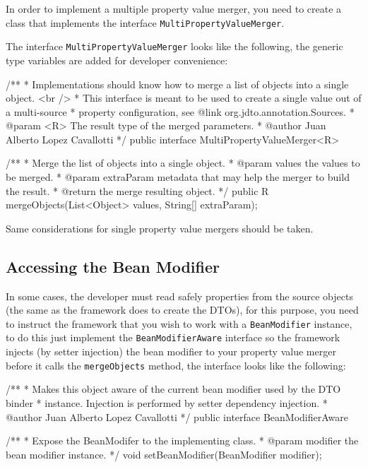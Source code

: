 \documentclass[11pt]{article}
\begin{document}
In order to implement a multiple property value merger, you need to create a class that implements the interface \texttt{MultiPropertyValueMerger}.

The interface \texttt{MultiPropertyValueMerger} looks like the following, the generic type variables are added for developer convenience:

\begin{java}
/**
 * Implementations should know how to merge a list of objects into a single object. <br />
 * This interface is meant to be used to create a single value out of a multi-source
 * property configuration, see {@link org.jdto.annotation.Sources}.
 * @param <R> The result type of the merged parameters.
 * @author Juan Alberto Lopez Cavallotti
 */
public interface MultiPropertyValueMerger<R> {
    
    /**
     * Merge the list of objects into a single object.
     * @param values the values to be merged.
     * @param extraParam metadata that may help the merger to build the result.
     * @return the merge resulting object.
     */
    public R mergeObjects(List<Object> values, String[] extraParam);
}
\end{java}

Same considerations for single property value mergers should be taken.

\subsection{Accessing the Bean Modifier}

In some cases, the developer must read safely properties from the source objects (the same as the framework does to create the DTOs), for this purpose, you need to instruct the framework that you wish to work with a \texttt{BeanModifier} instance, to do this just implement the \texttt{BeanModifierAware} interface so the framework injects (by setter injection) the bean modifier to your property value merger before it calls the \texttt{mergeObjects} method, the interface looks like the following:

\begin{java}
/**
 * Makes this object aware of the current bean modifier used by the DTO binder
 * instance. Injection is performed by setter dependency injection.
 * @author Juan Alberto Lopez Cavallotti
 */
public interface BeanModifierAware {
    
    /**
     * Expose the BeanModifer to the implementing class.
     * @param modifier the bean modifier instance.
     */
    void setBeanModifier(BeanModifier modifier);
}
\end{java}
\end{document}
